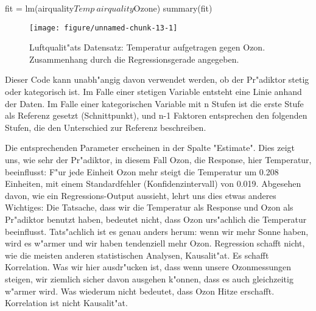 \documentclass[a4paper,twoside]{tufte-book}\usepackage[]{graphicx}\usepackage[]{color}
\makeatletter
\def\maxwidth{ %
  \ifdim\Gin@nat@width>\linewidth
    \linewidth
  \else
    \Gin@nat@width
  \fi
}
\makeatother
\begin{document}
\begin{Schunk}
\begin{Sinput}
fit = lm(airquality$Temp~airquality$Ozone)
summary(fit)
\end{Sinput}
\end{Schunk}

\begin{figure}[htbp]
\begin{center}
\begin{Schunk}

\texttt{[image: figure/unnamed-chunk-13-1]} \end{Schunk}
\caption{Luftqualit"ats Datensatz: Temperatur aufgetragen gegen Ozon. Zusammenhang durch die Regressionsgerade angegeben.}
\label{fig: LR}
\end{center}
\end{figure}

Dieser Code kann unabh"angig davon verwendet werden, ob der Pr"adiktor stetig oder kategorisch ist. Im Falle einer stetigen Variable entsteht eine Linie anhand der Daten. Im Falle einer kategorischen Variable mit n Stufen ist die erste Stufe als Referenz gesetzt (Schnittpunkt), und n-1 Faktoren entsprechen den folgenden Stufen, die den Unterschied zur Referenz beschreiben.

Die entsprechenden Parameter erscheinen in der Spalte "Estimate". Dies zeigt uns, wie sehr der Pr"adiktor, in diesem Fall Ozon, die Response, hier Temperatur, beeinflusst: F"ur jede Einheit Ozon mehr steigt die Temperatur um 0.208 Einheiten, mit einem Standardfehler (Konfidenzintervall) von 0.019. Abgesehen davon, wie ein Regressions-Output aussieht, lehrt uns dies etwas anderes Wichtiges: Die Tatsache, dass wir die Temperatur als Response und Ozon als Pr"adiktor benutzt haben, bedeutet nicht, dass Ozon urs"achlich die Temperatur beeinflusst. Tats"achlich ist es genau anders herum: wenn wir mehr Sonne haben, wird es w"armer und wir haben tendenziell mehr Ozon. Regression schafft nicht, wie die meisten anderen statistischen Analysen, Kausalit"at. Es schafft Korrelation. Was wir hier ausdr"ucken ist, dass wenn unsere Ozonmessungen steigen, wir ziemlich sicher davon ausgehen k"onnen, dass es auch gleichzeitig w"armer wird. Was wiederum nicht bedeutet, dass Ozon Hitze erschafft. Korrelation ist nicht Kausalit"at.
\end{document}

